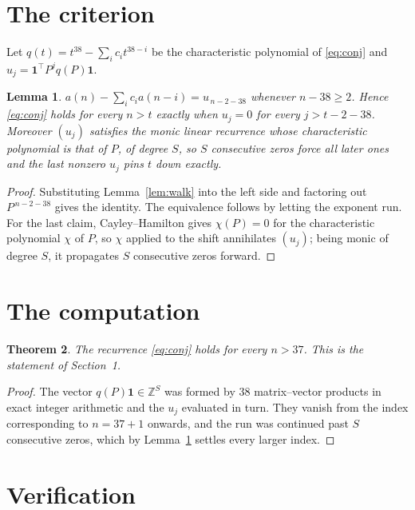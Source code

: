 \documentclass[11pt,a4paper]{article}
\theoremstyle{plain}
\newtheorem{theorem}{Theorem}
\newtheorem{lemma}[theorem]{Lemma}
\theoremstyle{definition}
\begin{document}
\section{The criterion}

Let $q(t)=t^{38}-\sum_i c_i t^{38-i}$ be the characteristic polynomial of
\eqref{eq:conj} and $u_j=\mathbf{1}^{\!\top}P^{j}q(P)\mathbf{1}$.

\begin{lemma}\label{lem:crit}
$a(n)-\sum_i c_i a(n-i)=u_{\,n-2-38}$ whenever $n-38\ge2$. Hence
\eqref{eq:conj} holds for every $n>t$ exactly when $u_j=0$ for every
$j>t-2-38$. Moreover $(u_j)$ satisfies the monic linear recurrence whose
characteristic polynomial is that of $P$, of degree $S$, so $S$ consecutive zeros force all
later ones and the last nonzero $u_j$ pins $t$ down exactly.
\end{lemma}

\begin{proof}
Substituting Lemma~\ref{lem:walk} into the left side and factoring out
$P^{\,n-2-38}$ gives the identity. The equivalence follows by letting the exponent
run. For the last claim, Cayley--Hamilton gives $\chi(P)=0$ for the characteristic
polynomial $\chi$ of $P$, so $\chi$ applied to the shift annihilates $(u_j)$; being monic of
degree $S$, it propagates $S$ consecutive zeros forward.
\end{proof}

\section{The computation}

\begin{theorem}
The recurrence \eqref{eq:conj} holds for every $n>37$. This is the statement of
Section~1.
\end{theorem}

\begin{proof}
The vector $q(P)\mathbf{1}\in\mathbb{Z}^{S}$ was formed by $38$ matrix--vector
products in exact integer arithmetic and the $u_j$ evaluated in turn. They vanish from the
index corresponding to $n=37+1$ onwards, and the run was continued past $S$ consecutive
zeros, which by Lemma~\ref{lem:crit} settles every larger index.
\end{proof}

\section{Verification}
\end{document}
